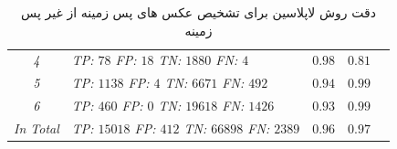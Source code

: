 \begin{enumerate}
\begin{table}[t]
\begin{latin}
\begin{tabular}{|c|l|c|c|c|}
                \textit{4} & \textit{TP: $78$    FP: $18$  TN: $1880$  FN: $4$} & $0.98$ & $0.81$\\
                \textit{5} & \textit{TP: $1138$  FP: $4$   TN: $6671$  FN: $492$} & $0.94$ & $0.99$\\
                \textit{6} & \textit{TP: $460$   FP: $0$   TN: $19618$ FN: $1426$} & $0.93$ & $0.99$\\
                \hline
                \textit{In Total} & \textit{TP: $15018$ FP: $412$ TN: $66898$ FN: $2389$} & $0.96$ & $0.97$\\
                \hline
            \end{tabular}
        \end{latin}
        \caption{دقت روش لاپلاسین برای تشخیص عکس های پس زمینه از غیر پس زمینه}
        \label{جدول: دقت روش لاپلاسین بر روی شش اسلاید}
    \end{table}


\end{enumerate}
